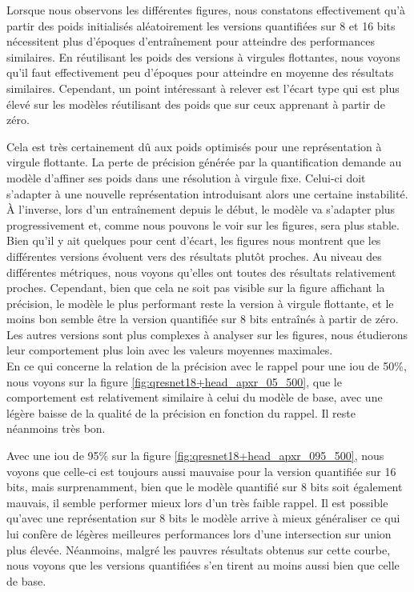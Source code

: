 \break

Lorsque nous observons les différentes figures, nous constatons effectivement qu'à partir des poids initialisés aléatoirement les versions quantifiées sur 8 et 16 bits nécessitent plus d'époques d'entraînement pour atteindre des performances similaires. En réutilisant les poids des versions à virgules flottantes, nous voyons qu'il faut effectivement peu d'époques pour atteindre en moyenne des résultats similaires. Cependant, un point intéressant à relever est l'écart type qui est plus élevé sur les modèles réutilisant des poids que sur ceux apprenant à partir de zéro.

Cela est très certainement dû aux poids optimisés pour une représentation à virgule flottante. La perte de précision générée par la quantification demande au modèle d'affiner ses poids dans une résolution à virgule fixe. Celui-ci doit s'adapter à une nouvelle représentation introduisant alors une certaine instabilité. À l'inverse, lors d'un entraînement depuis le début, le modèle va s'adapter plus progressivement et, comme nous pouvons le voir sur les figures, sera plus stable.\\

Bien qu'il y ait quelques pour cent d'écart, les figures nous montrent que les différentes versions évoluent vers des résultats plutôt proches. Au niveau des différentes métriques, nous voyons qu'elles ont toutes des résultats relativement proches. Cependant, bien que cela ne soit pas visible sur la figure affichant la précision, le modèle le plus performant reste la version à virgule flottante, et le moins bon semble être la version quantifiée sur 8 bits entraînés à partir de zéro. Les autres versions sont plus complexes à analyser sur les figures, nous étudierons leur comportement plus loin avec les valeurs moyennes maximales.\\

En ce qui concerne la relation de la précision avec le rappel pour une \acrshort{iou} de 50\%, nous voyons sur la figure \ref{fig:qresnet18+head_apxr_05_500}, que le comportement est relativement similaire à celui du modèle de base, avec une légère baisse de la qualité de la précision en fonction du rappel. Il reste néanmoins très bon.

Avec une \acrshort{iou} de 95\% sur la figure \ref{fig:qresnet18+head_apxr_095_500}, nous voyons que celle-ci est toujours aussi mauvaise pour la version quantifiée sur 16 bits, mais surprenamment, bien que le modèle quantifié sur 8 bits soit également mauvais, il semble performer mieux lors d'un très faible rappel. Il est possible qu'avec une représentation sur 8 bits le modèle arrive à mieux généraliser ce qui lui confère de légères meilleures performances lors d'une intersection sur union plus élevée. Néanmoins, malgré les pauvres résultats obtenus sur cette courbe, nous voyons que les versions quantifiées s'en tirent au moins aussi bien que celle de base.\\


